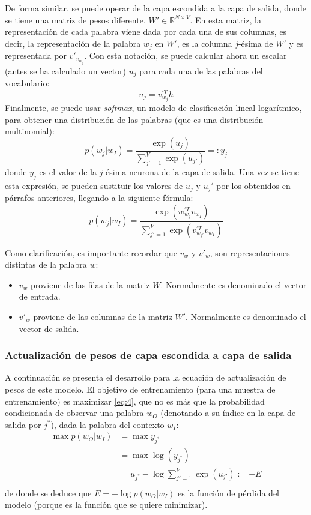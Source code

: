 De forma similar, se puede operar de la capa escondida a la capa de salida, donde se tiene una matriz de pesos diferente, $W'\in\mathbb{R}^{N\times V}$. En esta matriz, la representación
de cada palabra viene dada por cada una de sus columnas, es decir, la representación de la palabra $w_j$ en $W'$, es la columna $j$-ésima de $W'$ y es representada por $v'_{v_{w_j}}$. Con
esta notación, se puede calcular ahora un escalar (antes se ha calculado un vector) $u_j$ para cada una de las palabras del vocabulario:
\begin{equation}\label{eq:uj}
  u_j = v_{w_j}^{'T}h
\end{equation}
Finalmente, se puede usar \textit{softmax}, un modelo de clasificación lineal logarítmico, para obtener una distribución de las palabras (que es una distribución multinomial):
\begin{equation}\label{eq:yj}
p(w_j|w_I) = \frac{\exp(u_j)}{\sum_{j'=1}^V\exp(u_{j'})} =: y_j
\end{equation}
donde $y_j$ es el valor de la $j$-ésima neurona de la capa de salida. Una vez se tiene esta expresión, se pueden sustituir los valores de $u_j$ y $u_j'$ por los obtenidos
en párrafos anteriores, llegando a la siguiente fórmula:
\begin{equation}\label{eq:4}
  p(w_j|w_I) = \frac{\exp(w^{'T}_{w_j}v_{w_I})}{\sum_{j'=1}^V\exp(v^{'T}_{w_{j'}}v_{w_I})}
\end{equation}

Como clarificación, es importante recordar que $v_w$ y $v'_w$, son representaciones distintas de la palabra $w$:
\begin{itemize}
  \item $v_w$ proviene de las filas de la matriz $W$. Normalmente es denominado el vector de entrada.
  \item $v'_w$ proviene de las columnas de la matriz $W'$. Normalmente es denominado el vector de salida.
\end{itemize}

\subsubsection*{Actualización de pesos de capa escondida a capa de salida}

A continuación se presenta el desarrollo para la ecuación de actualización de pesos de este modelo. El objetivo de
entrenamiento (para una muestra de entrenamiento) es maximizar \ref*{eq:4}, que no es más que la probabilidad condicionada
de observar una palabra $w_O$ (denotando a su índice en la capa de salida por $j^*$), dada la palabra del contexto $w_I$:
\begin{equation}
  \begin{split}
  \max p(w_O|w_I) & = \max y_{j^*}\\
         & =\max \log(y_{j^*})\\
         & = u_{j^*} - \log \sum_{j'=1}^V\exp(u_{j'}) := -E \\
  \end{split}
\end{equation}
de donde se deduce que $E=-\log p(w_O|w_I)$ es la función de pérdida del modelo (porque es la función que se quiere minimizar).

